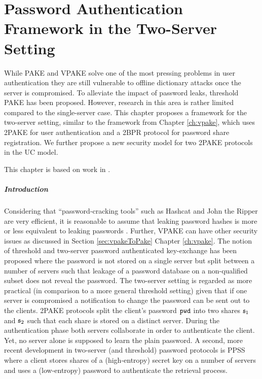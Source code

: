 \chapter{Password Authentication Framework in the Two-Server Setting} \label{ch:2pake}

While \ac{PAKE} and \ac{VPAKE} solve one of the most pressing problems in user authentication they are still vulnerable to offline dictionary attacks once the server is compromised.
To alleviate the impact of password leaks, threshold \ac{PAKE} has been proposed.
However, research in this area is rather limited compared to the single-server case.
This chapter proposes a framework for the two-server setting, similar to the framework from Chapter \ref{ch:vpake}, which uses \ac{2PAKE} for user authentication and a \ac{2BPR} protocol for password share registration.
We further propose a new security model for two \ac{2PAKE} protocols in the \ac{UC} model.

This chapter is based on work in \cite{KieferM14b,KieferM15b,KieferM15c}.

\paragraph{Introduction}

Considering that ``password-cracking tools'' such as Hashcat \cite{hashcat} and John the Ripper \cite{JohnTheRipper} are very efficient, it is reasonable to assume that leaking password hashes is more or less equivalent to leaking passwords \cite{NarayananS05a,WeirAMG09,DellAmicoMR10,Bonneau12}.
Further, \ac{VPAKE} can have other security issues as discussed in Section \ref{sec:vpakeToPake} Chapter \ref{ch:vpake}.
The notion of threshold and two-server password authenticated key-exchange \cite{FordK00,MacKenzieSJ02} has been proposed where the password is not stored on a single server but split between a number of servers such that leakage of a password database on a non-qualified subset does not reveal the password.
The two-server setting is regarded as more practical (in comparison to a more general threshold setting) given that if one server is compromised a notification to change the password can be sent out to the clients.
\ac{2PAKE} protocols \cite{BrainardJKS03,SzydloK05,Katz2012a} split the client's password $\mathtt{pwd}$ into two shares $\mathfrak{s}_1$ and $\mathfrak{s}_2$ such that each share is stored on a distinct server.
During the authentication phase both servers collaborate in order to authenticate the client.
Yet, no server alone is supposed to learn the plain password.
A second, more recent development in two-server (and threshold) password protocols is \ac{PPSS} \cite{Bagherzandi2011,Camenisch2012,JareckiKK14} where a client stores shares of a (high-entropy) secret key on a number of servers and uses a (low-entropy) password to authenticate the retrieval process.

